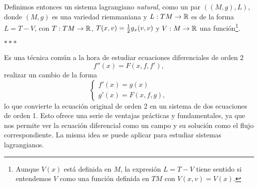   Definimos entonces un sistema lagrangiano \emph{natural}, como un par $\left( (M,g), L \right)$, donde $(M,g)$ es una variedad riemmaniana y $L:TM \rightarrow \mathbb{R}$ es de la forma $L=T-V$, con $T:TM \rightarrow \mathbb{R}$, $T(x,v)=\tfrac{1}{2} g_x(v,v)$ y $V: M \rightarrow \mathbb{R}$ una función\footnote{Aunque $V(x)$ está definida en $M$, la expresión $L=T-V$ tiene sentido si entendemos $V$ como una función definida en $TM$ con $V(x,v)=V(x)$.}.

  \begin{center}  $\ast\ast\ast$ \end{center}

  Es una técnica común a la hora de estudiar ecuaciones diferenciales de orden 2 \[f''(x)=F(x,f,f'),\] realizar un cambio de la forma
  \begin{equation*}
    \left\lbrace
    \begin{array}{l}
      f'(x)=g(x) \\
      g'(x)=F(x,f,g),
    \end{array}
    \right.
  \end{equation*}
  lo que convierte la ecuación original de orden 2 en un sistema de dos ecuaciones de orden 1. Esto ofrece una serie de ventajas prácticas y fundamentales, ya que nos permite ver la ecuación diferencial como un campo y su solución como el flujo correspondiente. La misma idea se puede aplicar para estudiar sistemas lagrangianos.

